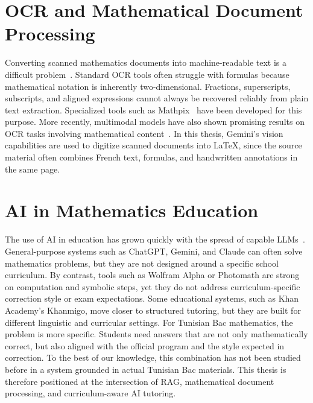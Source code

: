 \section{OCR and Mathematical Document Processing}
\label{sec:ocr-background}

Converting scanned mathematics documents into machine-readable text is a
difficult problem~\cite{zanibbi2016math_retrieval}. Standard OCR tools often
struggle with formulas because mathematical notation is inherently
two-dimensional. Fractions, superscripts, subscripts, and aligned
expressions cannot always be recovered reliably from plain text extraction.
Specialized tools such as Mathpix~\cite{mathpix2024} have been developed for
this purpose. More recently, multimodal models have also shown promising
results on OCR tasks involving mathematical content~\cite{wang2023ocrbench,mahdavi2019icdar_math}.
In this thesis, Gemini's vision capabilities are used to digitize scanned
documents into \LaTeX{}, since the source material often combines French
text, formulas, and handwritten annotations in the same page.

\section{AI in Mathematics Education}
\label{sec:ai-education}

The use of AI in education has grown quickly with the spread of capable
LLMs~\cite{kasneci2023chatgpt_education}. General-purpose systems such as
ChatGPT, Gemini, and Claude can often solve mathematics problems, but they
are not designed around a specific school curriculum. By contrast, tools
such as Wolfram Alpha or Photomath are strong on computation and symbolic
steps, yet they do not address curriculum-specific correction style or exam
expectations. Some educational systems, such as Khan Academy's Khanmigo,
move closer to structured tutoring, but they are built for different
linguistic and curricular settings.
For Tunisian Bac mathematics, the problem is more specific. Students need
answers that are not only mathematically correct, but also aligned with the
official program and the style expected in correction. To the best of our
knowledge, this combination has not been studied before in a system grounded
in actual Tunisian Bac materials. This thesis is therefore positioned at the
intersection of RAG, mathematical document processing, and curriculum-aware
AI tutoring.

